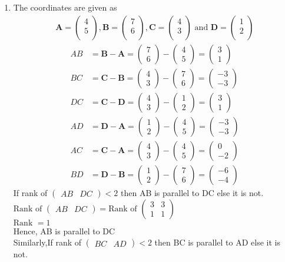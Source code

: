 \documentclass[12pt]{article}
\newcommand{\myvec}[1]{\ensuremath{\begin{pmatrix}#1\end{pmatrix}}}
\let\vec\mathbf
\begin{document}
\begin{enumerate}
\item The coordinates are given as
	\begin{align}
	\vec{A} = \myvec{
		4\\
		5\\
		},
	\vec{B} = \myvec{
		7\\
		6\\
		},
	\vec{C} = \myvec{
		4\\
		3\\
		} \text{ and }
	\vec{D} = \myvec{
		1\\
		2\\
		}
	\end{align}
	\begin{align}
		AB &= \vec{B} - \vec{A} = \myvec{7\\6} - \myvec{4\\5} = \myvec{3\\1}\\
		BC &= \vec{C} - \vec{B} = \myvec{4\\3} - \myvec{7\\6} = \myvec{-3\\-3}\\
		DC &= \vec{C} - \vec{D} = \myvec{4\\3} - \myvec{1\\2} = \myvec{3\\1}\\
		AD &= \vec{D} - \vec{A} = \myvec{1\\2} - \myvec{4\\5} = \myvec{-3\\-3}\\
		AC &= \vec{C} - \vec{A} = \myvec{4\\3} - \myvec{4\\5} = \myvec{0\\-2}\\
		BD &= \vec{D} - \vec{B} = \myvec{1\\2} - \myvec{7\\6} = \myvec{-6\\-4}
	\end{align}
	If rank of $\myvec{AB & DC} < 2$ then AB is parallel to DC else it is not.\\
	$\text{Rank of } \myvec{AB & DC} = \text{Rank of }\myvec{3&3\\1&1}$\\
	$\text{Rank } = 1$\\
	Hence, AB is parallel to DC\\
	Similarly,If rank of $\myvec{BC & AD} < 2$ then BC is parallel to AD else it is not.\\

\end{enumerate}
\end{document}

